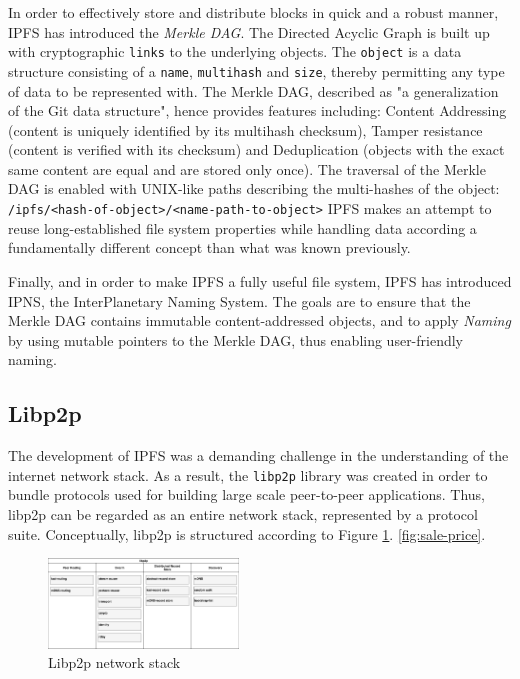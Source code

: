 \documentclass[conference]{IEEEtran}
\begin{document}
In order to effectively store and distribute blocks in quick and a robust manner, IPFS has introduced the \textit{Merkle DAG}.
The Directed Acyclic Graph is built up with cryptographic \texttt{links} to the underlying objects.
The \texttt{object} is a data structure consisting of a \texttt{name}, \texttt{multihash} and \texttt{size}, thereby permitting any type of data to be represented with.
The Merkle DAG, described as "a generalization of the Git data structure"\cite{ipfs-whitepaper}, hence provides features including: Content Addressing (content is uniquely identified by its multihash checksum), Tamper resistance (content is verified with its checksum) and Deduplication (objects with the exact same content are equal and are stored only once). \cite{ipfs-whitepaper}
The traversal of the Merkle DAG is enabled with UNIX-like paths describing the multi-hashes of the object:\\
\texttt{/ipfs/<hash-of-object>/<name-path-to-object>}
IPFS makes an attempt to reuse long-established file system properties while handling data according a fundamentally different concept than what was known previously.

Finally, and in order to make IPFS a fully useful file system, IPFS has introduced IPNS\cite{ipns}, the InterPlanetary Naming System.
The goals are to ensure that the Merkle DAG contains immutable content-addressed objects, and to apply \textit{Naming} by using mutable pointers to the Merkle DAG, thus enabling user-friendly naming. \cite{ipfs-whitepaper}

\subsection{Libp2p}
The development of IPFS was a demanding challenge in the understanding of the internet network stack. \cite{libp2p-github}
As a result, the \texttt{libp2p} library was created in order to bundle protocols used for building large scale peer-to-peer applications.
Thus, libp2p can be regarded as an entire network stack, represented by a protocol suite.
Conceptually, libp2p is structured according to Figure \ref{fig:libp2p-stack}.
\ref{fig:sale-price}.
\begin{figure}[h]
\centering
\includegraphics[width=0.45\textwidth]{libp2p-short.png}
\caption{Libp2p network stack}
\label{fig:libp2p-stack}
\end{figure}
\end{document}
